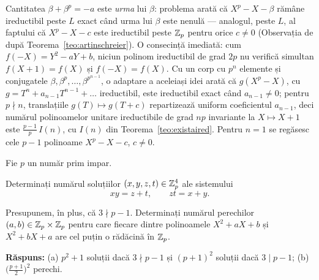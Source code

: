 \begin{solutie}
Cantitatea $\beta+\beta^p=-a$ este \emph{urma} lui $\beta$: problema arată că $X^p-X-\beta$ rămâne ireductibil peste $L$ exact când urma lui $\beta$ este nenulă --- analogul, peste $L$, al faptului că $X^p-X-c$ este ireductibil peste $\mathbb{Z}_p$ pentru orice $c\neq0$ (Observația de după Teorema~\ref{teo:artinschreier}). O consecință imediată: cum $f(-X)=Y^2-aY+b$, niciun polinom ireductibil de grad $2p$ nu verifică simultan $f(X+1)=f(X)$ și $f(-X)=f(X)$. Cu un corp cu $p^n$ elemente și conjugatele $\beta,\beta^p,\dots,\beta^{p^{n-1}}$, o adaptare a aceleiași idei arată că $g(X^p-X)$, cu $g=T^n+a_{n-1}T^{n-1}+\dots$ ireductibil, este ireductibil exact când $a_{n-1}\neq0$; pentru $p\nmid n$, translațiile $g(T)\mapsto g(T+c)$ repartizează uniform coeficientul $a_{n-1}$, deci numărul polinoamelor unitare ireductibile de grad $np$ invariante la $X\mapsto X+1$ este $\frac{p-1}{p}\,I(n)$, cu $I(n)$ din Teorema~\ref{teo:existaired}. Pentru $n=1$ se regăsesc cele $p-1$ polinoame $X^p-X-c$, $c\neq0$.
\end{solutie}

\begin{problema}
Fie $p$ un număr prim impar.
\begin{parti}
\item Determinați numărul soluțiilor $(x,y,z,t) \in \mathbb{Z}_p^4$ ale sistemului
\[
  xy = z + t, \qquad zt = x + y .
\]
\item Presupunem, în plus, că $3 \nmid p-1$. Determinați numărul perechilor $(a,b) \in \mathbb{Z}_p \times \mathbb{Z}_p$ pentru care fiecare dintre polinoamele $X^2 + aX + b$ și $X^2 + bX + a$ are cel puțin o rădăcină în $\mathbb{Z}_p$.
\end{parti}
\end{problema}

\noindent\textbf{Răspuns:} (a) $p^2 + 1$ soluții dacă $3 \nmid p-1$ și $(p+1)^2$ soluții dacă $3 \mid p-1$; (b) $\bigl(\frac{p+1}{2}\bigr)^2$ perechi.

